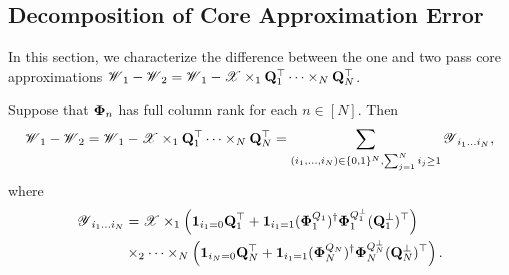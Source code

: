 \subsection{Decomposition of Core Approximation Error}
In this section, we characterize the
difference between the one and two pass core approximations
$\T{W}_1-\T{W}_2 = \T{W}_1 - \T{X}\times_1 \M{Q}_1^\top \dots \times_N \M{Q}_N^\top$.
\begin{lem}
\label{lemma:core_error_decomposition}
Suppose that $\mathbf{\Phi}_n$ has full column rank for each $n \in [N]$.
Then
\begin{equation}
\T{W}_1-\T{W}_2 = \T{W}_1 - \T{X}\times_1 \M{Q}_1^\top \dots \times_N \M{Q}_N^\top =
\sum_{(i_1,\dots, i_N) \in \{0,1\}^N, \sum_{j=1}^N i_j \geq 1} \T{Y}_{i_1\dots i_N}, \nonumber
\end{equation}
where
\begin{equation}
\label{eq:def_each_part}
\begin{aligned}
\T{Y}_{i_1\dots i_N} &= \T{X}\times_1 \left(\mathbf{1}_{i_1=0}\M{Q}_1^\top + \mathbf{1}_{i_1=1}(\M{\Phi}_1^{Q_1})^\dag  \M{\Phi}_1^{Q_1^\bot}(\M{Q}_1^\bot)^\top \right)\\
&\times_2 \cdots \times_N \left(\mathbf{1}_{i_N=0}\M{Q}_N^\top + \mathbf{1}_{i_1=1}(\M{\Phi}_N^{Q_N})^\dag  \M{\Phi}_N^{Q_N^\bot}(\M{Q}_N^\bot)^\top \right).
\end{aligned}
\end{equation}
\end{lem}
